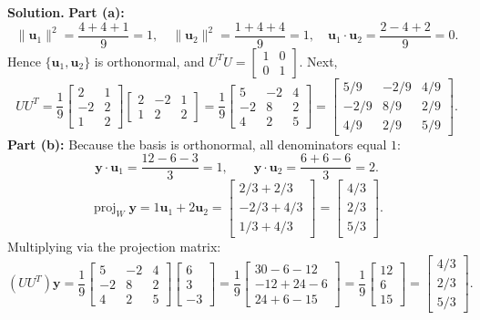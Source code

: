 \documentclass[11pt, letterpaper]{article}
\theoremstyle{definition}
\theoremstyle{remark}
\begin{document}
\textbf{Solution.}
\textbf{Part (a):}
\[
\|\mathbf{u}_1\|^2 = \frac{4 + 4 + 1}{9} = 1, \quad \|\mathbf{u}_2\|^2 = \frac{1 + 4 + 4}{9} = 1, \quad \mathbf{u}_1 \cdot \mathbf{u}_2 = \frac{2 - 4 + 2}{9} = 0.
\]
Hence $\{\mathbf{u}_1, \mathbf{u}_2\}$ is orthonormal, and $U^T U = \begin{bmatrix} 1 & 0 \\ 0 & 1 \end{bmatrix}$. Next,
\[
UU^T = \frac{1}{9}\begin{bmatrix} 2 & 1 \\ -2 & 2 \\ 1 & 2 \end{bmatrix}\begin{bmatrix} 2 & -2 & 1 \\ 1 & 2 & 2 \end{bmatrix} = \frac{1}{9}\begin{bmatrix} 5 & -2 & 4 \\ -2 & 8 & 2 \\ 4 & 2 & 5 \end{bmatrix} = \begin{bmatrix} 5/9 & -2/9 & 4/9 \\ -2/9 & 8/9 & 2/9 \\ 4/9 & 2/9 & 5/9 \end{bmatrix}.
\]
\textbf{Part (b):} Because the basis is orthonormal, all denominators equal $1$:
\[
\mathbf{y} \cdot \mathbf{u}_1 = \frac{12 - 6 - 3}{3} = 1, \qquad \mathbf{y} \cdot \mathbf{u}_2 = \frac{6 + 6 - 6}{3} = 2.
\]
\[
\operatorname{proj}_W \mathbf{y} = 1\mathbf{u}_1 + 2\mathbf{u}_2 = \begin{bmatrix} 2/3 + 2/3 \\ -2/3 + 4/3 \\ 1/3 + 4/3 \end{bmatrix} = \begin{bmatrix} 4/3 \\ 2/3 \\ 5/3 \end{bmatrix}.
\]
Multiplying via the projection matrix:
\[
(UU^T)\mathbf{y} = \frac{1}{9}\begin{bmatrix} 5 & -2 & 4 \\ -2 & 8 & 2 \\ 4 & 2 & 5 \end{bmatrix}\begin{bmatrix} 6 \\ 3 \\ -3 \end{bmatrix} = \frac{1}{9}\begin{bmatrix} 30 - 6 - 12 \\ -12 + 24 - 6 \\ 24 + 6 - 15 \end{bmatrix} = \frac{1}{9}\begin{bmatrix} 12 \\ 6 \\ 15 \end{bmatrix} = \begin{bmatrix} 4/3 \\ 2/3 \\ 5/3 \end{bmatrix}.
\]
\end{document}
